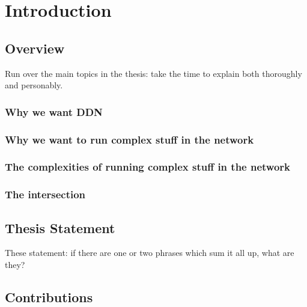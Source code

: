 \chapter{Introduction}

\section{Overview}

Run over the main topics in the thesis: take the time to explain both thoroughly and personably.

\subsection{Why we want DDN}

\subsection{Why we want to run complex stuff in the network}

\subsection{The complexities of running complex stuff in the network}

\subsection{The intersection}

\section{Thesis Statement}

These statement: if there are one or two phrases which sum it all up, what are they?

\section{Contributions}

